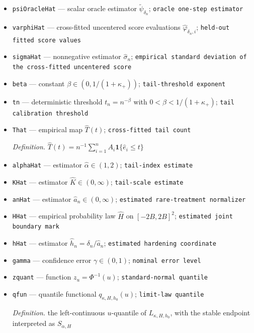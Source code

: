 \documentclass{article}
\begin{document}
\begin{itemize}
  \item \texttt{psiOracleHat} --- scalar oracle estimator \(\widetilde\psi_{\delta_n}\); \texttt{oracle one-\allowbreak{}step estimator}
  \item \texttt{varphiHat} --- cross-fitted uncentered score evaluations \(\widehat\varphi_{\delta_n,i}\); \texttt{held-\allowbreak{}out fitted score values}
  \item \texttt{sigmaHat} --- nonnegative estimator \(\widehat\sigma_n\); \texttt{empirical standard deviation of the cross-\allowbreak{}fitted uncentered score}
  \item \texttt{beta} --- constant \(\beta\in(0,1/(1+\kappa_+))\); \texttt{tail-\allowbreak{}threshold exponent}
  \item \texttt{tn} --- deterministic threshold \(t_n=n^{-\beta}\) with \(0<\beta<1/(1+\kappa_+)\); \texttt{tail calibration threshold}
  \item \texttt{That} --- empirical map \(\widehat T(t)\); \texttt{cross-\allowbreak{}fitted tail count}
  \par\smallskip\noindent\emph{Definition.} \(\widehat T(t)=n^{-1}\sum_{i=1}^n A_i\mathbf 1\{\widehat e_i\leq t\}\)
  \item \texttt{alphaHat} --- estimator \(\widehat\alpha\in(1,2)\); \texttt{tail-\allowbreak{}index estimate}
  \item \texttt{KHat} --- estimator \(\widehat K\in(0,\infty)\); \texttt{tail-\allowbreak{}scale estimate}
  \item \texttt{anHat} --- estimator \(\widehat a_n\in(0,\infty)\); \texttt{estimated rare-\allowbreak{}treatment normalizer}
  \item \texttt{HHat} --- empirical probability law \(\widehat H\) on \([-2B,2B]^2\); \texttt{estimated joint boundary mark}
  \item \texttt{hHat} --- estimator \(\widehat h_n=\delta_n/\widehat a_n\); \texttt{estimated hardening coordinate}
  \item \texttt{gamma} --- confidence error \(\gamma\in(0,1)\); \texttt{nominal error level}
  \item \texttt{zquant} --- function \(z_u=\Phi^{-1}(u)\); \texttt{standard-\allowbreak{}normal quantile}
  \item \texttt{qfun} --- quantile functional \(q_{\kappa,H,h_0}(u)\); \texttt{limit-\allowbreak{}law quantile}
  \par\smallskip\noindent\emph{Definition.} the left-continuous \(u\)-quantile of \(L_{\kappa,H,h_0}\), with the stable endpoint interpreted as \(S_{\alpha,H}\)

\end{itemize}
\end{document}

